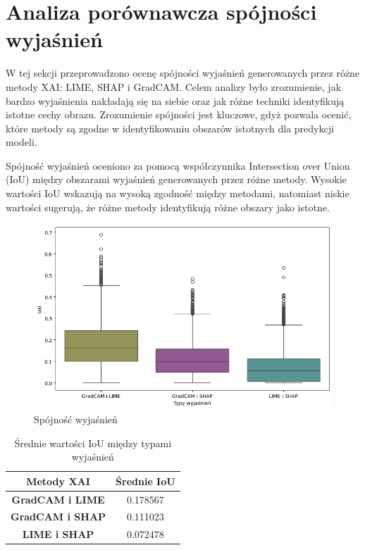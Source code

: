 \section*{Analiza porównawcza spójności wyjaśnień}

W tej sekcji przeprowadzono ocenę spójności wyjaśnień generowanych przez różne metody XAI: LIME, SHAP i GradCAM.
Celem analizy było zrozumienie, jak bardzo wyjaśnienia nakładają się na siebie oraz jak różne techniki identyfikują istotne cechy obrazu.
Zrozumienie spójności jest kluczowe, gdyż pozwala ocenić, które metody są zgodne w identyfikowaniu obszarów istotnych dla predykcji modeli.

Spójność wyjaśnień oceniono za pomocą współczynnika Intersection over Union (IoU) między obszarami wyjaśnień generowanych przez różne metody.
Wysokie wartości IoU wskazują na wysoką zgodność między metodami, natomiast niskie wartości sugerują, że różne metody identyfikują różne obszary jako istotne.

\begin{figure}[h]
	\centering\includegraphics[width=.9\textwidth]{img/base_coherence}
	\caption{Spójność wyjaśnień}  \label{rys:base_coherence}
\end{figure}

\begin{table}[h]
	\centering
	\begin{tabular}{|c|c|}
		\hline
		\textbf{Metody XAI}     & \textbf{Średnie IoU} \\
		\hline
		\textbf{GradCAM i LIME} & 0.178567             \\
		\hline
		\textbf{GradCAM i SHAP} & 0.111023             \\
		\hline
		\textbf{LIME i SHAP}    & 0.072478             \\
		\hline
	\end{tabular}
	\caption{Średnie wartości IoU między typami wyjaśnień}
	\label{tab:base_coherence}
\end{table}

